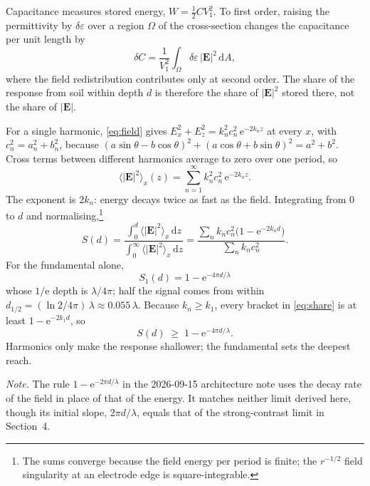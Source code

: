 \documentclass[11pt,letterpaper]{article}
\newcommand{\e}{\mathrm{e}}
\newcommand{\dd}{\,\mathrm{d}}
\begin{document}
Capacitance measures stored energy, $W = \tfrac12 C V_1^2$. To first order, raising the permittivity by
$\delta\varepsilon$ over a region $\Omega$ of the cross-section changes the capacitance per unit length by
\begin{equation}
  \delta C = \frac{1}{V_1^2} \int_\Omega \delta\varepsilon\, |\mathbf{E}|^2 \dd A,
  \label{eq:perturb}
\end{equation}
where the field redistribution contributes only at second order. The share of the response from soil
within depth $d$ is therefore the share of $|\mathbf{E}|^2$ stored there, not the share of
$|\mathbf{E}|$.

For a single harmonic, \eqref{eq:field} gives
$E_x^2 + E_z^2 = k_n^2 c_n^2\, \e^{-2k_n z}$ at every $x$, with $c_n^2 = a_n^2 + b_n^2$, because
$(a\sin\theta - b\cos\theta)^2 + (a\cos\theta + b\sin\theta)^2 = a^2 + b^2$. Cross terms between different
harmonics average to zero over one period, so
\begin{equation}
  \bigl\langle |\mathbf{E}|^2 \bigr\rangle_x (z) = \sum_{n=1}^{\infty} k_n^2 c_n^2\, \e^{-2k_n z}.
  \label{eq:energy}
\end{equation}
The exponent is $2k_n$: energy decays twice as fast as the field. Integrating from $0$ to $d$ and
normalising,\footnote{The sums converge because the field energy per period is finite; the
$r^{-1/2}$ field singularity at an electrode edge is square-integrable.}
\begin{equation}
  S(d) = \frac{\int_0^d \langle |\mathbf{E}|^2\rangle_x \dd z}{\int_0^\infty \langle |\mathbf{E}|^2\rangle_x \dd z}
       = \frac{\sum_n k_n c_n^2 \bigl( 1 - \e^{-2k_n d} \bigr)}{\sum_n k_n c_n^2}.
  \label{eq:share}
\end{equation}
For the fundamental alone,
\begin{equation}
  \boxed{\;S_1(d) = 1 - \e^{-4\pi d/\lambda}\;}
  \label{eq:share1}
\end{equation}
whose $1/\e$ depth is $\lambda/4\pi$; half the signal comes from within $d_{1/2} = (\ln 2/4\pi)\,\lambda
\approx 0.055\,\lambda$. Because $k_n \ge k_1$, every bracket in \eqref{eq:share} is at least
$1 - \e^{-2k_1 d}$, so
\begin{equation}
  S(d) \;\ge\; 1 - \e^{-4\pi d/\lambda}.
  \label{eq:bound}
\end{equation}
Harmonics only make the response shallower; the fundamental sets the deepest reach.

\medskip\noindent
\emph{Note.} The rule $1 - \e^{-2\pi d/\lambda}$ in the 2026-09-15 architecture note uses the decay
rate of the field in place of that of the energy. It matches neither limit derived here, though its
initial slope, $2\pi d/\lambda$, equals that of the strong-contrast limit in Section~4.
\end{document}
